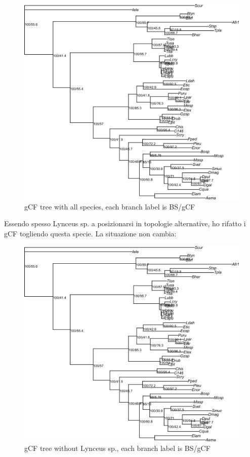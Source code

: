 \begin{figure}[h!]
    \centering
    \includegraphics[width=1\textwidth]{Figures/gCF_allspecies.tree.png}
    \caption[gCF Tree]{gCF tree with all species, each branch label is BS/gCF
}
    \label{fig:gCF_allspecies}
\end{figure}

\pagebreak
Essendo spesso Lynceus sp. a posizionarsi in topologie alternative, ho rifatto i gCF togliendo questa specie. La situazione non cambia:

\begin{figure}[h!]
    \centering
    \includegraphics[width=1\textwidth]{Figures/gCF_nolysp.tree.png}
    \caption[gCF Tree without Lynceys sp.]{gCF tree without Lynceus sp., each branch label is BS/gCF
}
    \label{fig:gCF_nolysp}
\end{figure}

